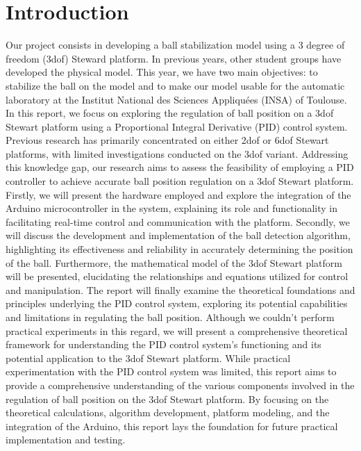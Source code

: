 \section{Introduction}

Our project consists in developing a ball stabilization model using a 3 degree of freedom (3dof) Steward platform. In previous years, other student groups have developed the physical model. This year, we have two main objectives: to stabilize the ball on the model and to make our model usable for the automatic laboratory at the Institut National des Sciences Appliquées (INSA) of Toulouse.
In this report, we focus on exploring the regulation of ball position on a 3dof Stewart platform using a Proportional Integral Derivative (PID) control system.
\newline\newline
Previous research has primarily concentrated on either 2dof \cite{kumar_design_2016, adiprasetya_implementation_2016} or 6dof \cite{lee_position_2003, koszewnik_pid_2014} Stewart platforms, with limited investigations conducted on the 3dof variant. Addressing this knowledge gap, our research aims to assess the feasibility of employing a PID controller to achieve accurate ball position regulation on a 3dof Stewart platform.
\newline\newline
Firstly, we will present the hardware employed and explore the integration of the Arduino microcontroller in the system, explaining its role and functionality in facilitating real-time control and communication with the platform.
\newline
Secondly, we will discuss the development and implementation of the ball detection algorithm, highlighting its effectiveness and reliability in accurately determining the position of the ball.
\newline
Furthermore, the mathematical model of the 3dof Stewart platform will be presented, elucidating the relationships and equations utilized for control and manipulation.
\newline
The report will finally examine the theoretical foundations and principles underlying the PID control system, exploring its potential capabilities and limitations in regulating the ball position. Although we couldn't perform practical experiments in this regard, we will present a comprehensive theoretical framework for understanding the PID control system's functioning and its potential application to the 3dof Stewart platform.
\newline\newline
While practical experimentation with the PID control system was limited, this report aims to provide a comprehensive understanding of the various components involved in the regulation of ball position on the 3dof Stewart platform. By focusing on the theoretical calculations, algorithm development, platform modeling, and the integration of the Arduino, this report lays the foundation for future practical implementation and testing.




